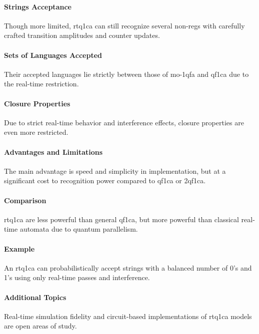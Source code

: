 \paragraph{Strings Acceptance}
Though more limited, \gls{rtq1ca} can still recognize several non-\glspl{reg} with carefully crafted transition amplitudes and counter updates.

\paragraph{Sets of Languages Accepted}
Their accepted languages lie strictly between those of \gls{mo-1qfa} and \gls{qf1ca} due to the real-time restriction.

\paragraph{Closure Properties}
Due to strict real-time behavior and interference effects, closure properties are even more restricted.

\paragraph{Advantages and Limitations}
The main advantage is speed and simplicity in implementation, but at a significant cost to recognition power compared to \gls{qf1ca} or \gls{2qf1ca}.

\paragraph{Comparison}
\gls{rtq1ca} are less powerful than general \gls{qf1ca}, but more powerful than classical real-time automata due to quantum parallelism.

\paragraph{Example}
An \gls{rtq1ca} can probabilistically accept strings with a balanced number of 0's and 1's using only real-time passes and interference.

\paragraph{Additional Topics}
Real-time simulation fidelity and circuit-based implementations of \gls{rtq1ca} models are open areas of study.
